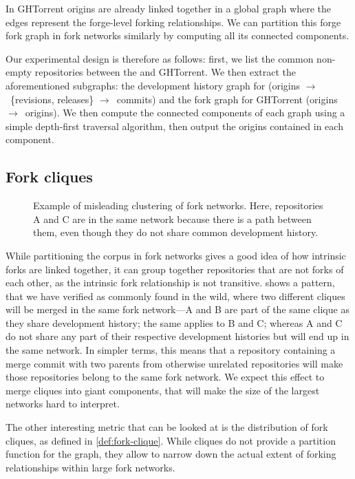 In GHTorrent origins are already linked together in a global graph where the
edges represent the forge-level forking relationships. We can partition this
forge fork graph in fork networks similarly by computing all its connected
components.

Our experimental design is therefore as follows: first, we list the common
non-empty repositories between the \SWHGD{} and GHTorrent. We then extract the
aforementioned subgraphs: the development history graph for \SWH{} (origins
$\to$~\{revisions, releases\} $\to$~commits) and the fork graph for GHTorrent
(origins $\to$~origins). We then compute the connected components of each graph
using a simple depth-first traversal algorithm, then output the origins
contained in each component.

\subsection{Fork cliques}%
\label{sec:methodology-fork-cliques}

\begin{figure}[t]
  \centering
  
  \caption{Example of misleading clustering of fork networks.  Here,
    repositories A and C are in the same network because there is a path
    between them, even though they do not share common development history.}%
  \label{fig:fork-transitive-fail}
\end{figure}

While partitioning the corpus in fork networks gives a good idea of how
intrinsic forks are linked together, it can group together repositories that
are not forks of each other, as the intrinsic fork relationship is not
transitive.  shows a pattern, that we
have verified as commonly found in the wild, where two different cliques will
be merged in the same fork network---A and B are part of the same clique as
they share development history; the same applies to B and C; whereas A and C do
not share any part of their respective development histories but will end up in
the same network. In simpler terms, this means that a repository containing a
merge commit with two parents from otherwise unrelated repositories will make
those repositories belong to the same fork network.  We expect this effect to
merge cliques into giant components, that will make the size of the largest
networks hard to interpret.

The other interesting metric that can be looked at is the distribution of fork
cliques, as defined in \cref{def:fork-clique}. While cliques do not
provide a partition function for the graph, they allow to narrow down the
actual extent of forking relationships within large fork networks.

